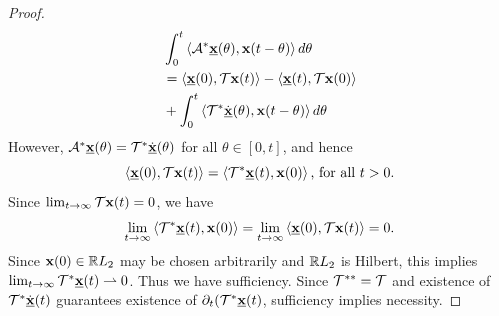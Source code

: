 \begin{proof}
\begin{equation*}
\begin{aligned}
            &\int_0^t\left\langle \mathcal{A}^*\underline{\mathbf{x}}(\theta), \mathbf{x}(t-\theta) \right\rangle d\theta \\
            &=\left\langle \underline{\mathbf{x}}(0), \mathcal{T}\mathbf{x}(t) \right\rangle - \left\langle \underline{\mathbf{x}}(t), \mathcal{T}\mathbf{x}(0) \right\rangle
            \\
            &+\int_0^t\left\langle \mathcal{T}^*\dot{\underline{\mathbf{x}}}(\theta), \mathbf{x}(t-\theta) \right\rangle d\theta
        \end{aligned}
    \end{equation*}
    However, $\mathcal{A}^*\underline{\mathbf{x}}(\theta)=\mathcal{T}^*\dot{\underline{\mathbf{x}}}(\theta)$ for all $\theta\in[0,t]$, and hence
    \begin{equation}\label{eqn:ipeq}
        \left\langle \underline{\mathbf{x}}(0), \mathcal{T}{\mathbf{x}}(t) \right\rangle = \left\langle \mathcal{T}^*\underline{\mathbf{x}}(t), {\mathbf{x}}(0) \right\rangle\text{,    for all }t>0. 
    \end{equation}
    Since $\lim_{t\to\infty} \mathcal{T}\mathbf{x}(t) = 0$, we have
    \begin{equation*}
        \lim_{t\to\infty}\left\langle \mathcal{T}^*\underline{\mathbf{x}}(t), \mathbf{x}(0) \right\rangle = \lim_{t\to\infty}\left\langle \underline{\mathbf{x}}(0), \mathcal{T}\mathbf{x}(t) \right\rangle = 0.
    \end{equation*}
    Since $\mathbf{x}(0)\in\mathbb{R} L_2$ may be chosen arbitrarily and $\mathbb{R} L_2$ is Hilbert, this implies $\lim_{t\to\infty} \mathcal{T}^*\underline{\mathbf{x}}(t) \rightharpoonup 0$. Thus we have sufficiency. Since $\mathcal{T}^{**} = \mathcal{T}$ and existence of $\mathcal{T}^*\dot{\underline{\mathbf{x}}}(t)$ guarantees existence of $\partial_t(\mathcal{T}^*\underline{\mathbf{x}}(t)$, sufficiency implies necessity.
\end{proof}
